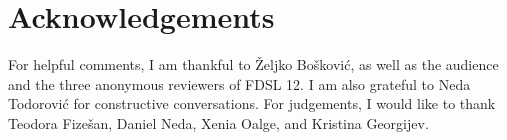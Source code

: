 \documentclass[output=paper,
hidelinks,
newtxmath,
]{langscibook}
\begin{document}
\section*{Acknowledgements}

For helpful comments, I am thankful to Željko Bošković, as well as the audience and the three anonymous reviewers of FDSL 12. I am also grateful to Neda Todorović for constructive conversations. For judgements, I would like to thank Teodora Fizešan, Daniel Neda, Xenia Oalge, and Kristina Georgijev.

\sloppy
\printbibliography[heading=subbibliography,notkeyword=this]
\end{document}
